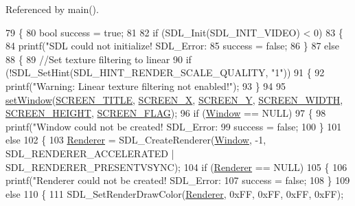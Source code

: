 Referenced by main().


\begin{DoxyCode}
79 \{
80     \textcolor{keywordtype}{bool} success = \textcolor{keyword}{true};
81 
82     \textcolor{keywordflow}{if} (SDL\_Init(SDL\_INIT\_VIDEO) < 0)
83     \{
84         printf(\textcolor{stringliteral}{"SDL could not initialize! SDL\_Error: %
85         success = \textcolor{keyword}{false};
86     \}
87     \textcolor{keywordflow}{else}
88     \{
89         \textcolor{comment}{//Set texture filtering to linear}
90         \textcolor{keywordflow}{if} (!SDL\_SetHint(SDL\_HINT\_RENDER\_SCALE\_QUALITY, \textcolor{stringliteral}{"1"}))
91         \{
92             printf(\textcolor{stringliteral}{"Warning: Linear texture filtering not enabled!"});
93         \}
94 
95         \hyperlink{class_s_d_l_window_ad14a7b1965115315210ba34b7239e598}{setWindow}(\hyperlink{class_s_d_l_window_afeb1a7d48dde026d437babea6667ebee}{SCREEN\_TITLE}, \hyperlink{class_s_d_l_window_ade54e8777a5e5017b139b4559c791634}{SCREEN\_X}, \hyperlink{class_s_d_l_window_abdb8d6136e9724e854c491cb9eef054d}{SCREEN\_Y}, 
      \hyperlink{class_s_d_l_window_ab3faec77de829876613ea52176ef61e1}{SCREEN\_WIDTH}, \hyperlink{class_s_d_l_window_aed36cc4e541ecf78cda7e92f99a84d71}{SCREEN\_HEIGHT}, \hyperlink{class_s_d_l_window_a52d0a3b9ea7107e63476b24bc8a43397}{SCREEN\_FLAG});
96         \textcolor{keywordflow}{if} (\hyperlink{class_s_d_l_window_aa95576b14f59ec62a9e7f6fb8c2f79cc}{Window} == NULL)
97         \{
98             printf(\textcolor{stringliteral}{"Window could not be created! SDL\_Error: %
99             success = \textcolor{keyword}{false};
100         \}
101         \textcolor{keywordflow}{else}
102         \{
103             \hyperlink{class_s_d_l_window_ae679402fd05b8eb3fd8680f1f036aaca}{Renderer} = SDL\_CreateRenderer(\hyperlink{class_s_d_l_window_aa95576b14f59ec62a9e7f6fb8c2f79cc}{Window}, -1, SDL\_RENDERER\_ACCELERATED | 
      SDL\_RENDERER\_PRESENTVSYNC);
104             \textcolor{keywordflow}{if} (\hyperlink{class_s_d_l_window_ae679402fd05b8eb3fd8680f1f036aaca}{Renderer} == NULL)
105             \{
106                 printf(\textcolor{stringliteral}{"Renderer could not be created! SDL\_Error: %
107                 success = \textcolor{keyword}{false};
108             \}
109             \textcolor{keywordflow}{else}
110             \{
111                 SDL\_SetRenderDrawColor(\hyperlink{class_s_d_l_window_ae679402fd05b8eb3fd8680f1f036aaca}{Renderer}, 0xFF, 0xFF, 0xFF, 0xFF);
}}}
\end{DoxyCode}
